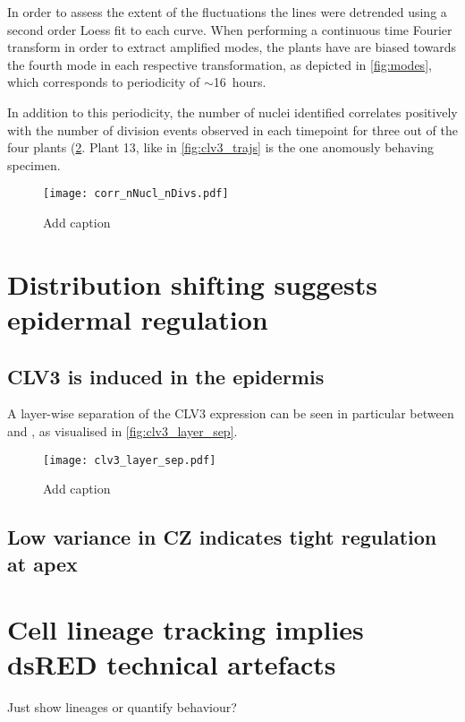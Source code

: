 In order to assess the extent of the fluctuations the lines were detrended using
a second order Loess fit to each curve. When performing a continuous time
Fourier transform in order to extract amplified modes, the plants have are
biased towards the fourth mode in each respective transformation, as depicted in
\cref{fig:modes}, which corresponds to periodicity of $\sim$16~hours. \FIG
{}

In addition to this periodicity, the number of nuclei identified correlates
positively with the number of division events observed in each timepoint for
three out of the four plants (\cref{fig:corr_nNucl_nDivs}. Plant 13, like in 
\cref{fig:clv3_trajs} is the one anomously behaving specimen.

\begin{figure}[H]
  \centering
  \texttt{[image: corr\_nNucl\_nDivs.pdf]}
  \caption{Add caption}
  \label{fig:corr_nNucl_nDivs}
\end{figure}


\section{Distribution shifting suggests epidermal regulation}
\subsection{CLV3 is induced in the epidermis}
A layer-wise separation of the CLV3 expression can be seen in particular between
\Lone and \Ltwo, as visualised in \cref{fig:clv3_layer_sep}. 

\begin{figure}[H]
  \centering
  \texttt{[image: clv3\_layer\_sep.pdf]}
  \caption{Add caption}
  \label{fig:corr_nNucl_nDivs}
\end{figure}


\subsection{Low variance in CZ indicates tight regulation at apex}

\section{Cell lineage tracking implies dsRED technical artefacts}
Just show lineages or quantify behaviour? \\

